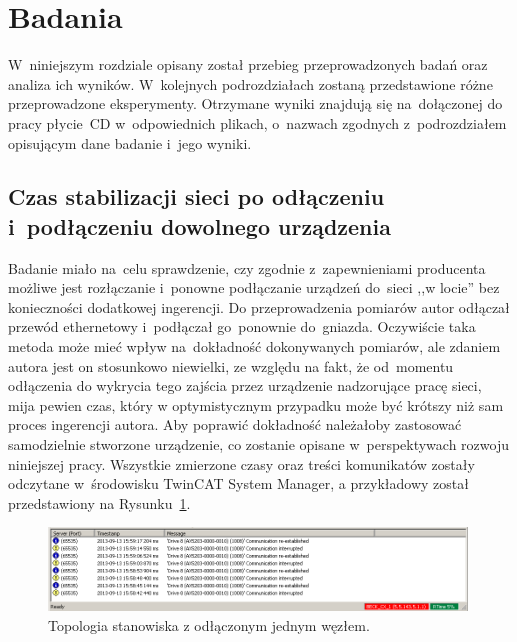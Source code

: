 \section{Badania}
W~niniejszym rozdziale opisany został przebieg przeprowadzonych badań oraz analiza ich wyników. W~kolejnych podrozdziałach zostaną przedstawione różne przeprowadzone eksperymenty. Otrzymane wyniki znajdują się na~dołączonej do pracy płycie~CD w~odpowiednich plikach, o~nazwach zgodnych z~podrozdziałem opisującym dane badanie i~jego wyniki.

\subsection{Czas stabilizacji sieci po odłączeniu i~podłączeniu dowolnego urządzenia}
Badanie miało na~celu sprawdzenie, czy zgodnie z~zapewnieniami producenta możliwe jest rozłączanie i~ponowne podłączanie urządzeń do~sieci ,,w locie'' bez konieczności dodatkowej ingerencji. Do przeprowadzenia pomiarów autor odłączał przewód ethernetowy i~podłączał go~ponownie do~gniazda. Oczywiście taka metoda może mieć wpływ na~dokładność dokonywanych pomiarów, ale zdaniem autora jest on stosunkowo niewielki, ze względu na fakt, że od~momentu odłączenia do wykrycia tego zajścia przez urządzenie nadzorujące pracę sieci, mija pewien czas, który w optymistycznym przypadku może być krótszy niż sam proces ingerencji autora. Aby poprawić dokładność należałoby zastosować samodzielnie stworzone urządzenie, co zostanie opisane w~perspektywach rozwoju niniejszej pracy. Wszystkie zmierzone czasy oraz treści komunikatów zostały odczytane w~środowisku TwinCAT System Manager, a przykładowy został przedstawiony na Rysunku~\ref{reading_time}.

\begin{figure}[!htb] 	\centering 	\includegraphics[width=0.99\textwidth]{images/reading_time} \caption{Topologia stanowiska z odłączonym jednym węzłem.} \label{reading_time} \end{figure}

